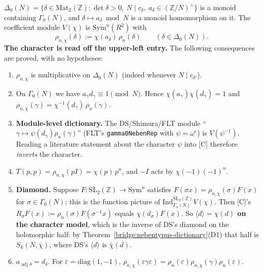 \begin{definition}\label{conv:nebentypus}
  \leanok
  $\Delta_0(N)=\{\delta\in\mathrm{Mat}_2(\mathbb Z):\det\delta>0,\ N\mid c_\delta,\ a_\delta\in(\mathbb Z/N)^\times\}$ is a
  monoid containing $\Gamma_0(N)$, and $\delta\mapsto a_\delta\bmod N$ is a monoid homomorphism on it. The coefficient
  module $V(\chi)$ is $\mathrm{Sym}^n(R^2)$ with
  \[
    \rho_{n,\chi}(\delta):=\chi(a_\delta)\,\rho_n(\delta)\qquad(\delta\in\Delta_0(N)).
  \]
  \textbf{The character is read off the upper-left entry.} The following consequences are proved, with no
  hypotheses:
  \begin{enumerate}
    \item $\rho_{n,\chi}$ is multiplicative on $\Delta_0(N)$ (indeed whenever $N\mid c_{\delta'}$).
    \item On $\Gamma_0(N)$ we have $a_\gamma d_\gamma\equiv1\pmod N$. Hence $\chi(a_\gamma)\chi(d_\gamma)=1$ and
      $\rho_{n,\chi}(\gamma)=\chi^{-1}(d_\gamma)\,\rho_n(\gamma)$.
    \item \textbf{Module-level dictionary.} The DS/Shimura/FLT module ``$\gamma\mapsto\psi(d_\gamma)\rho_n(\gamma)$''
      (FLT's \texttt{gamma0NebenRep} with $\psi=\omega^{e}$) is $V(\psi^{-1})$. Reading a literature statement about the
      character $\psi$ into [C] therefore \emph{inverts} the character.
    \item $T(p,p)=\rho_{n,\chi}(pI)=\chi(p)\,p^{n}$, and $-I$ acts by $\chi(-1)(-1)^n$.
    \item \textbf{Diamond.} Suppose $F\colon\mathrm{SL}_2(\mathbb Z)\to\mathrm{Sym}^n$ satisfies
      $F(\sigma x)=\rho_{n,\chi}(\sigma)F(x)$ for $\sigma\in\Gamma_0(N)$; this is the function picture of
      $\mathrm{Ind}_{\Gamma_0(N)}^{\mathrm{SL}_2(\mathbb Z)}V(\chi)$. Then [C]'s
      $R_\sigma F(x):=\rho_n(\sigma)F(\sigma^{-1}x)$ equals $\chi(d_\sigma)F(x)$. So
      \textbf{$\langle d\rangle=\chi(d)$ on the character model}, which is the inverse of DS's diamond on the
      holomorphic half: by Theorem~\ref{bridge:nebentypus-dictionary}(D1) that half is $S_k(N,\bar\chi)$, where
      DS's $\langle d\rangle$ is $\bar\chi(d)$.
    \item $a_{\operatorname{adj}\delta}=d_\delta$. For $\varepsilon=\mathrm{diag}(1,-1)$,
      $\rho_{n,\chi}(\varepsilon\gamma\varepsilon)=\rho_n(\varepsilon)\rho_{n,\chi}(\gamma)\rho_n(\varepsilon)$.
  \end{enumerate}
\end{definition}
